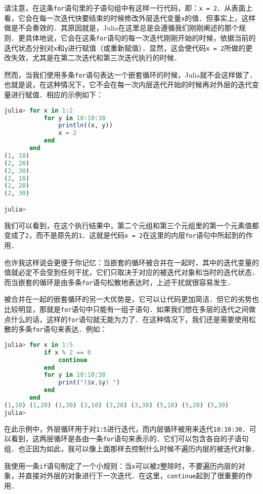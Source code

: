 请注意，在这条\verb|for|语句里的子语句组中有这样一行代码，即：\verb|x = 2|．从表面上看，它会在每一次迭代快要结束的时候修改外层迭代变量\verb|x|的值．但事实上，这样做是不会奏效的．其原因就是，Julia在这里总是会遵循我们刚刚阐述的那个规则．更具体地说，它会在这条\verb|for|语句的每一次迭代刚刚开始的时候，依据当前的迭代状态分别对\verb|x|和\verb|y|进行赋值（或重新赋值）．显然，这会使代码\verb|x = 2|所做的更改失效，尤其是在第二次迭代和第三次迭代执行的时候．

然而，当我们使用多条\verb|for|语句表达一个嵌套循环的时候，Julia就不会这样做了．也就是说，在这种情况下，它不会在每一次内层迭代开始的时候再对外层的迭代变量进行赋值．相应的示例如下：
\begin{lstlisting}[language=julia]
julia> for x in 1:2
           for y in 10:10:30
               println((x, y))
               x = 2
           end
       end
(1, 10)
(2, 20)
(2, 30)
(2, 10)
(2, 20)
(2, 30)

julia> 
\end{lstlisting}

我们可以看到，在这个执行结果中，第二个元组和第三个元组里的第一个元素值都变成了\verb|2|，而不是原先的\verb|1|．这就是代码\verb|x = 2|在这里的内层\verb|for|语句中所起到的作用．

也许我这样说会更便于你记忆：当嵌套的循环被合并在一起时，其中的迭代变量的值就必定不会受到任何干扰，它们只取决于对应的被迭代对象和当时的迭代状态．而当嵌套的循环是由多条\verb|for|语句松散地表达时，上述干扰就很容易发生．

被合并在一起的嵌套循环的另一大优势是，它可以让代码更加简洁．但它的劣势也比较明显，那就是\verb|for|语句中只能有一组子语句．如果我们想在多层的迭代之间做点什么的话，这样的\verb|for|语句就无能为力了．在这种情况下，我们还是需要使用松散的多条\verb|for|语句来表达．例如：
\begin{lstlisting}[language=julia]
julia> for x in 1:5
           if x % 2 == 0
               continue
           end
           for y in 10:10:30
               print("($x,$y) ")
           end
       end
(1,10) (1,20) (1,30) (3,10) (3,20) (3,30) (5,10) (5,20) (5,30) 
julia> 
\end{lstlisting}

在此示例中，外层循环用于对\verb|1:5|进行迭代，而内层循环被用来迭代\verb|10:10:30|．可以看到，这两层循环是各由一条\verb|for|语句来表示的．它们可以包含各自的子语句组．也正因为如此，我可以像上面那样去控制什么时候不遍历内层的被迭代对象．

我使用一条\verb|if|语句制定了一个小规则：当\verb|x|可以被\verb|2|整除时，不要遍历内层的对象，并直接对外层的对象进行下一次迭代．在这里，\verb|continue|起到了很重要的作用．


